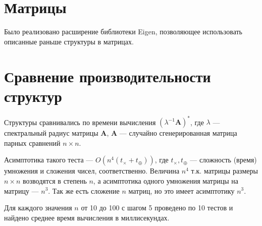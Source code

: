 \documentclass[specialist,
substylefile = spbu.rtx,
               subf,href,colorlinks=true, 12pt]{disser}
\begin{document}


    \section{Матрицы}
    Было реализовано расширение библиотеки Eigen, позволяющее использовать описанные раньше структуры в матрицах.


    
    \section{Сравнение производительности структур}

    Структуры сравнивались по времени вычисления $(\lambda^{-1}\bm{A})^*$, где $\lambda$ --- спектральный радиус матрицы $\bm{A}$, $\bm{A}$ --- случайно сгенерированная матрица парных сравнений $n\times n$.

    Асимптотика такого теста --- $O(n^4 (t_\times + t_\oplus))$, где $t_\times, t_\oplus$ --- сложность (время) умножения и сложения чисел, соответственно.
    Величина $n^4$ т.к. матрицы размеры $n\times n$ возводятся в степень $n$, а асимптотика одного умножения матрицы на матрицу --- $n^3$. Так же есть сложение $n$ матриц, но это имеет асимптотику $n^3$.

    Для каждого значения $n$ от 10 до 100 с шагом 5 проведено по 10 тестов и найдено среднее время вычисления в миллисекундах.
\end{document}
